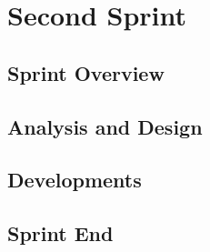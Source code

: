 \chapter{Second Sprint}\label{chap:sprint2}

\section{Sprint Overview}\label{sec:sprint2:overview}


\section{Analysis and Design}\label{sec:sprint2:analysis}






\section{Developments}\label{sec:sprint2:developments}



\section{Sprint End}\label{sec:sprint2:review}
